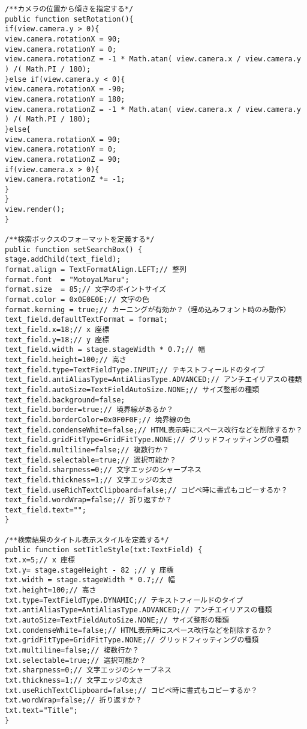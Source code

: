 {\begin{verbatim}
/**カメラの位置から傾きを指定する*/
public function setRotation(){
if(view.camera.y > 0){
view.camera.rotationX = 90;
view.camera.rotationY = 0;
view.camera.rotationZ = -1 * Math.atan( view.camera.x / view.camera.y ) /( Math.PI / 180);
}else if(view.camera.y < 0){
view.camera.rotationX = -90;
view.camera.rotationY = 180;
view.camera.rotationZ = -1 * Math.atan( view.camera.x / view.camera.y ) /( Math.PI / 180);
}else{
view.camera.rotationX = 90;
view.camera.rotationY = 0;
view.camera.rotationZ = 90;
if(view.camera.x > 0){
view.camera.rotationZ *= -1;
}
}
view.render();
}

/**検索ボックスのフォーマットを定義する*/
public function setSearchBox() {
stage.addChild(text_field);
format.align = TextFormatAlign.LEFT;// 整列
format.font  = "MotoyaLMaru";
format.size  = 85;// 文字のポイントサイズ
format.color = 0x0E0E0E;// 文字の色
format.kerning = true;// カーニングが有効か？（埋め込みフォント時のみ動作）
text_field.defaultTextFormat = format;
text_field.x=18;// x 座標
text_field.y=18;// y 座標
text_field.width = stage.stageWidth * 0.7;// 幅
text_field.height=100;// 高さ
text_field.type=TextFieldType.INPUT;// テキストフィールドのタイプ
text_field.antiAliasType=AntiAliasType.ADVANCED;// アンチエイリアスの種類
text_field.autoSize=TextFieldAutoSize.NONE;// サイズ整形の種類
text_field.background=false;
text_field.border=true;// 境界線があるか？
text_field.borderColor=0x0F0F0F;// 境界線の色
text_field.condenseWhite=false;// HTML表示時にスペース改行などを削除するか？
text_field.gridFitType=GridFitType.NONE;// グリッドフィッティングの種類
text_field.multiline=false;// 複数行か？
text_field.selectable=true;// 選択可能か？
text_field.sharpness=0;// 文字エッジのシャープネス
text_field.thickness=1;// 文字エッジの太さ
text_field.useRichTextClipboard=false;// コピペ時に書式もコピーするか？
text_field.wordWrap=false;// 折り返すか？
text_field.text="";
}

/**検索結果のタイトル表示スタイルを定義する*/
public function setTitleStyle(txt:TextField) {
txt.x=5;// x 座標
txt.y= stage.stageHeight - 82 ;// y 座標
txt.width = stage.stageWidth * 0.7;// 幅
txt.height=100;// 高さ
txt.type=TextFieldType.DYNAMIC;// テキストフィールドのタイプ
txt.antiAliasType=AntiAliasType.ADVANCED;// アンチエイリアスの種類
txt.autoSize=TextFieldAutoSize.NONE;// サイズ整形の種類
txt.condenseWhite=false;// HTML表示時にスペース改行などを削除するか？
txt.gridFitType=GridFitType.NONE;// グリッドフィッティングの種類
txt.multiline=false;// 複数行か？
txt.selectable=true;// 選択可能か？
txt.sharpness=0;// 文字エッジのシャープネス
txt.thickness=1;// 文字エッジの太さ
txt.useRichTextClipboard=false;// コピペ時に書式もコピーするか？
txt.wordWrap=false;// 折り返すか？
txt.text="Title";
}


\end{verbatim}}
